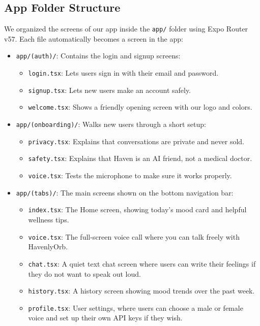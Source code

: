 \subsection{App Folder Structure}
We organized the screens of our app inside the \texttt{app/} folder using Expo Router v57. Each file automatically becomes a screen in the app:
\begin{itemize}
    \item \texttt{app/(auth)/}: Contains the login and signup screens:
    \begin{itemize}
        \item \texttt{login.tsx}: Lets users sign in with their email and password.
        \item \texttt{signup.tsx}: Lets new users make an account safely.
        \item \texttt{welcome.tsx}: Shows a friendly opening screen with our logo and colors.
    \end{itemize}
    \item \texttt{app/(onboarding)/}: Walks new users through a short setup:
    \begin{itemize}
        \item \texttt{privacy.tsx}: Explains that conversations are private and never sold.
        \item \texttt{safety.tsx}: Explains that Haven is an AI friend, not a medical doctor.
        \item \texttt{voice.tsx}: Tests the microphone to make sure it works properly.
    \end{itemize}
    \item \texttt{app/(tabs)/}: The main screens shown on the bottom navigation bar:
    \begin{itemize}
        \item \texttt{index.tsx}: The Home screen, showing today's mood card and helpful wellness tips.
        \item \texttt{voice.tsx}: The full-screen voice call where you can talk freely with HavenlyOrb.
        \item \texttt{chat.tsx}: A quiet text chat screen where users can write their feelings if they do not want to speak out loud.
        \item \texttt{history.tsx}: A history screen showing mood trends over the past week.
        \item \texttt{profile.tsx}: User settings, where users can choose a male or female voice and set up their own API keys if they wish.
    \end{itemize}
\end{itemize}

